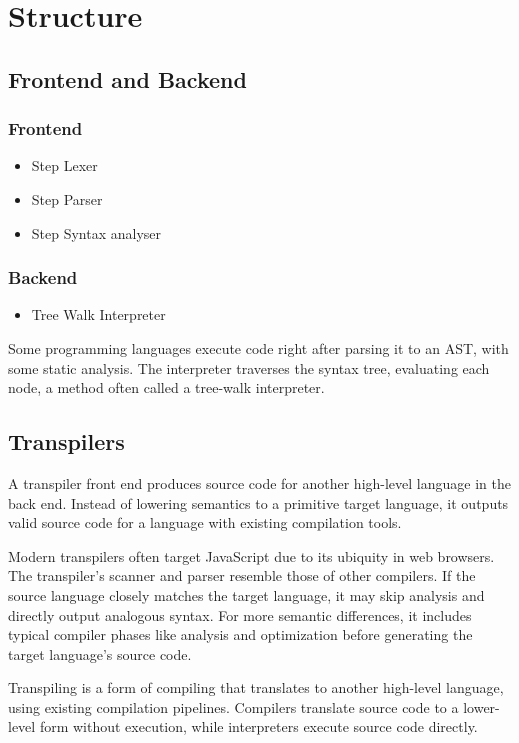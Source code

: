 \section{Structure}
\label{sec:interpreter}

\subsection{Frontend and Backend}
\label{sec:frontend_backend}

\subsubsection{Frontend}
\begin{itemize}
    \item Step Lexer
    \item Step Parser
    \item Step Syntax analyser
\end{itemize}

\subsubsection{Backend}
\begin{itemize}
    \item Tree Walk Interpreter
\end{itemize}

Some programming languages execute code right after parsing it to an AST, with some static analysis. The interpreter traverses the syntax tree, evaluating each node, a method often called a tree-walk interpreter.

\subsection{Transpilers}
\label{sec:transpilers}

A transpiler front end produces source code for another high-level language in the back end. Instead of lowering semantics to a primitive target language, it outputs valid source code for a language with existing compilation tools.

Modern transpilers often target JavaScript due to its ubiquity in web browsers. The transpiler's scanner and parser resemble those of other compilers. If the source language closely matches the target language, it may skip analysis and directly output analogous syntax. For more semantic differences, it includes typical compiler phases like analysis and optimization before generating the target language's source code.

Transpiling is a form of compiling that translates to another high-level language, using existing compilation pipelines. Compilers translate source code to a lower-level form without execution, while interpreters execute source code directly.
